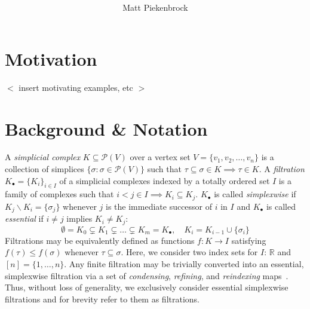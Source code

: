 \documentclass[10pt]{article}
\title{\vspace{-2.0em} \vspace{-0.5em}}
\author{Matt Piekenbrock}
\date{}
\begin{document}
\noindent

\section{Motivation}
$<$ insert motivating examples, etc $>$

\section{Background \& Notation}\label{sec:background_notation}
A \emph{simplicial complex} $K \subseteq \mathcal{P}(V)$ over a vertex set $V = \{v_1, v_2, \dots, v_n \}$ is a collection of simplices $\{\sigma : \sigma \in \mathcal{P}(V) \}$ such that $\tau \subseteq \sigma \in K \implies \tau \in K$.
A \emph{filtration} $K_\bullet = \{K_i\}_{i\in I}$ of a simplicial complexes indexed by a totally ordered set $I$ is a family of complexes such that $i< j \in I \implies K_i \subseteq K_j$. $K_\bullet$ is called \emph{simplexwise} if $K_j \smallsetminus K_i = \{\sigma_j\}$ whenever $j$ is the immediate successor of $i$ in $I$ and $K_\bullet$ is called \emph{essential} if $i \neq j$ implies $K_i \neq K_j$:
\begin{equation}
	\emptyset = K_0 \subsetneq K_1 \subsetneq \dots \subsetneq K_m  = K_\bullet, \quad K_i  = K_{i-1} \cup \{\sigma_i\}
\end{equation} 
Filtrations may be equivalently defined as functions $f : K \to I$ satisfying $f(\tau) \leq f(\sigma)$ whenever $\tau \subseteq \sigma$. Here, we consider two index sets for $I$: $\mathbb{R}$ and $[n] = \{ 1, \dots, n\}$. 
Any finite filtration may be trivially converted into an essential, simplexwise filtration via a set of \emph{condensing}, \emph{refining}, and \emph{reindexing} maps~\cite{bauer2021ripser}. Thus, without loss of generality, we exclusively consider essential simplexwise filtrations and for brevity refer to them as filtrations.
\end{document}
